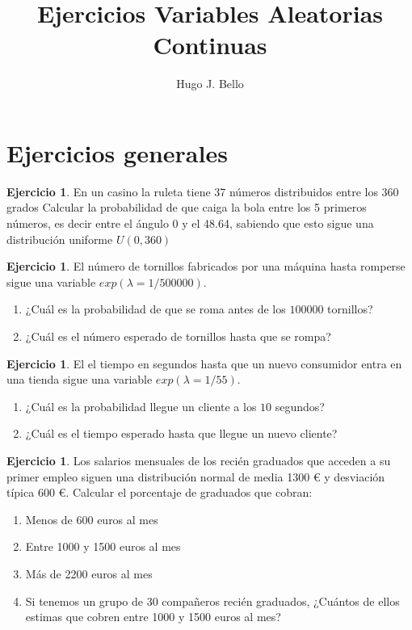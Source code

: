 \documentclass[]{article}
\title{Ejercicios Variables Aleatorias Continuas}
\author{Hugo J. Bello}
\date{}
\theoremstyle{plain}
\theoremstyle{definition}
\newtheorem{exercise}[theorem]{Ejercicio}
\theoremstyle{definition} %
\begin{document}
\maketitle
\section{Ejercicios generales}



\begin{exercise}
  En un casino la ruleta tiene  37 números distribuidos entre los 360 grados 
  Calcular la probabilidad de que caiga la bola entre los 5 primeros números, es decir entre el ángulo 0 y el  48.64, sabiendo que esto sigue una 
  distribución uniforme $U(0,360)$
  \end{exercise}



\begin{exercise}
  El número de tornillos fabricados por una máquina hasta romperse sigue una variable
  $exp(\lambda= 1/500 000)$. 
  \begin{enumerate}
    \item ¿Cuál es la probabilidad de que se roma antes de los $100000$ tornillos?
    \item ¿Cuál es el número esperado de tornillos hasta que se rompa?
  \end{enumerate}
\end{exercise}

\begin{exercise}
  El el tiempo en segundos hasta que un nuevo consumidor entra en una tienda sigue una variable
  $exp(\lambda= 1/55)$. 
  \begin{enumerate}
    \item ¿Cuál es la probabilidad llegue un cliente a los $10$ segundos?
    \item ¿Cuál es el tiempo esperado hasta que llegue un nuevo cliente?
  \end{enumerate}
\end{exercise}

\begin{exercise}
  Los salarios mensuales de los recién graduados que acceden a su primer empleo siguen una distribución normal de 
  media 1300 € y desviación típica 600 €. 
  Calcular el porcentaje de graduados que cobran:
  \begin{enumerate}
    \item Menos de 600 euros al mes
    \item Entre 1000 y 1500 euros al mes
    \item Más de 2200 euros al mes
    \item Si tenemos un grupo de 30 compañeros recién graduados, ¿Cuántos de ellos estimas que cobren entre 1000 y 1500 euros al mes?
  \end{enumerate}

\end{exercise}
\end{document}
